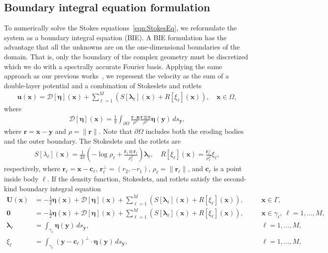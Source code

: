 \documentclass[3p]{elsarticle}
\newcommand{\edit}[1]{{\color{red} #1}}
\newcommand{\bd}{{\partial}}
\newcommand{\cc}{{\mathbf{c}}}
\newcommand{\DDD}{{\boldsymbol{\mathcal D}}}
\newcommand{\eeta}{{\boldsymbol\eta}}
\newcommand{\llambda}{{\boldsymbol\lambda}}
\newcommand{\nn}{{\mathbf{n}}}
\newcommand{\rr}{{\mathbf{r}}}
\newcommand{\uu}{{\mathbf{u}}}
\newcommand{\UU}{{\mathbf{U}}}
\newcommand{\xx}{{\mathbf{x}}}
\newcommand{\yy}{{\mathbf{y}}}
\begin{document}
\subsection{\edit{Boundary integral equation formulation}}
\label{sec:bie}
To \edit{numerically} solve the Stokes equations~\eqref{eqn:StokesEq}, we reformulate the system as a boundary integral equation (BIE). A BIE formulation has the advantage that all the unknowns are on the one-dimensional boundaries of the domain. That is, only the boundary of the complex geometry must be discretized which we do with a spectrally accurate Fourier basis. Applying the same approach as our previous works~\cite{chiu2020viscous, quaife2018boundary}, we represent the velocity as the sum of a double-layer potential and a combination of Stokeslets and rotlets~\cite{pow-mir1987}
\begin{align}
  \uu(\xx) = \DDD[\eeta](\xx) + \sum_{\ell=1}^{M}\left(
    S[\llambda_\ell](\xx) + R[\xi_\ell](\xx)\right), 
    \quad \xx \in \Omega,
  \label{eqn:velocity}
\end{align}
where 
\begin{align}
  \DDD[\eeta](\xx) = \frac{1}{\pi}\int_{\bd\Omega} 
  \frac{\rr \cdot \nn}{\rho^2} \frac{\rr \otimes \rr}{\rho^2}
  \eeta(\yy) \, ds_\yy,
  \label{eqn:velocityDLP}
\end{align}
where $\rr = \xx - \yy$ and $\rho = \|\rr\|$. Note that $\bd\Omega$ includes both the eroding bodies and the outer boundary. The Stokeslets and the rotlets are
\begin{align}
  S[\lambda_\ell](\xx) = \frac{1}{4\pi} \left(-\log \rho_\ell +
  \frac{\rr_\ell \otimes \rr_\ell}{\rho_\ell^2} \right) \llambda_\ell,
  \quad
  R[\xi_\ell](\xx) = \frac{\rr_\ell^\perp}{\rho_\ell^2}\xi_\ell,
\end{align}
respectively, where $\rr_\ell = \xx - \cc_\ell$, \edit{$\rr_\ell^\perp =
(r_2,-r_1)$,} $\rho_\ell = \|\rr_\ell\|$, and $\cc_\ell$ is a point inside body $\ell$. If the density function, Stokeslets, and rotlets satisfy the second-kind boundary integral equation
\begin{subequations}
  \label{eqn:FredBIE}
  \begin{alignat}{3}
    \UU(\xx) &= -\frac{1}{2}\eeta(\xx) + \DDD[\eeta](\xx) + 
      \sum_{\ell=1}^{M}\left(S[\llambda_\ell](\xx) + R[\xi_\ell](\xx)\right), 
      \quad &&\xx \in \Gamma, \\
    \mathbf{0} &= -\frac{1}{2}\eeta(\xx) + \DDD[\eeta](\xx) + 
      \sum_{\ell=1}^{M}\left(S[\llambda_\ell](\xx) + R[\xi_\ell](\xx)\right), 
      &&\xx \in \gamma_\ell, \: \ell = 1,\ldots,M, \\
    \llambda_\ell &= \int_{\gamma_\ell} \eeta(\yy) \, ds_\yy, 
      &&\ell = 1,\ldots,M, \\
    \xi_\ell &= \int_{\gamma_\ell} (\yy - \cc_\ell)^\perp \cdot 
      \eeta(\yy) \, ds_\yy, &&\ell = 1,\ldots,M,
  \end{alignat}
\end{subequations}
\end{document}
